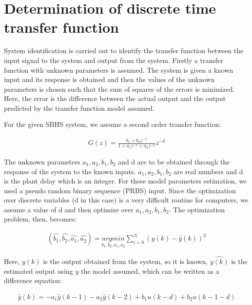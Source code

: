 \section{Determination of discrete time transfer function}\label{prbs-model}

System identification is carried out to identify the transfer function between the input signal to the system and output from the system. Firstly a transfer function with unknown parameters is assumed. The system is given a known input and its response is obtained and then the values of the unknown parameters is chosen such that the sum of squares of the errors is minimized. Here, the error is the difference between the actual output and the output predicted by the transfer function model assumed.



For the given SBHS system, we assume a second order transfer function:

\begin{align}\label{DTF}
G(z)=\frac{b_{1}+b_{2}z^{-1}}{1+a_{1}z^{-1}+a_{2}z^{-2}}z^{-d}
\end{align}


The unknown parameters $a_1, a_2, b_1, b_2$ and d are to be obtained through the response of the system to the known inputs.  $a_1, a_2, b_1, b_2$ are real numbers and d is the plant delay which is an integer.  For these model parameters estimation, we used a pseudo random binary sequence (PRBS) input. Since the optimization over discrete variables (d in this case) is a very difficult routine for computers, we assume a value of d and then optimize over  $a_1, a_2, b_1, b_2$. The optimization problem, then, becomes:


\begin{align}
(\hat{b_1}, \hat{b_2}, \hat{a_1}, \hat{a_2})=\underset{b_1, b_2, a_1, a_2}{argmin}\sum_{i=0}^{N}(y(k)-\hat{y}(k))^{2}
\end{align}


Here, $y(k)$ is the output obtained from the system, so it is known, $\hat{y(k)}$ is the estimated output using $y$ the model assumed, which can be written as a difference equation:

\begin{align}
\hat{y}(k) = -a_1\hat{y}(k - 1) - a_2\hat{y}(k - 2) + b_1 u(k - d) + b_2 u(k - 1 - d)
\end{align}

